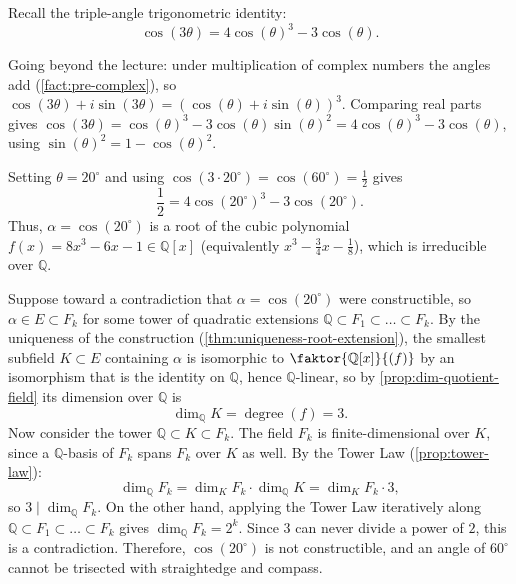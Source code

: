 \begin{content}
Recall the triple-angle trigonometric identity:
\[
\cos(3\theta) = 4 \cos(\theta)^3 - 3 \cos(\theta).
\]

\begin{steps}
Going beyond the lecture: under multiplication of complex numbers the angles add (\cref{fact:pre-complex}), so $\cos(3\theta) + i \sin(3\theta) = (\cos(\theta) + i \sin(\theta))^3$. Comparing real parts gives $\cos(3\theta) = \cos(\theta)^3 - 3 \cos(\theta) \sin(\theta)^2 = 4 \cos(\theta)^3 - 3 \cos(\theta)$, using $\sin(\theta)^2 = 1 - \cos(\theta)^2$.
\end{steps}

Setting $\theta = 20^\circ$ and using $\cos(3 \cdot 20^\circ) = \cos(60^\circ) = \frac{1}{2}$ gives
\[
\frac{1}{2} = 4 \cos(20^\circ)^3 - 3 \cos(20^\circ).
\]
Thus, $\alpha = \cos(20^\circ)$ is a root of the cubic polynomial $f(x) = 8x^3 - 6x - 1 \in \mathbb{Q}[x]$ (equivalently $x^3 - \frac{3}{4}x - \frac{1}{8}$), which is irreducible over $\mathbb{Q}$.

Suppose toward a contradiction that $\alpha = \cos(20^\circ)$ were constructible, so $\alpha \in E \subset F_k$ for some tower of quadratic extensions $\mathbb{Q} \subset F_1 \subset \dots \subset F_k$. By the uniqueness of the construction (\cref{thm:uniqueness-root-extension}), the smallest subfield $K \subset E$ containing $\alpha$ is isomorphic to $\faktor{\mathbb{Q}[x]}{(f)}$ by an isomorphism that is the identity on $\mathbb{Q}$, hence $\mathbb{Q}$-linear, so by \cref{prop:dim-quotient-field} its dimension over $\mathbb{Q}$ is
\[
\dim_{\mathbb{Q}} K = \operatorname{degree}(f) = 3.
\]
Now consider the tower $\mathbb{Q} \subset K \subset F_k$. The field $F_k$ is finite-dimensional over $K$, since a $\mathbb{Q}$-basis of $F_k$ spans $F_k$ over $K$ as well. By the Tower Law (\cref{prop:tower-law}):
\[
\dim_{\mathbb{Q}} F_k = \dim_K F_k \cdot \dim_{\mathbb{Q}} K = \dim_K F_k \cdot 3,
\]
so $3 \mid \dim_{\mathbb{Q}} F_k$. On the other hand, applying the Tower Law iteratively along $\mathbb{Q} \subset F_1 \subset \dots \subset F_k$ gives $\dim_{\mathbb{Q}} F_k = 2^k$. Since $3$ can never divide a power of $2$, this is a contradiction. Therefore, $\cos(20^\circ)$ is not constructible, and an angle of $60^\circ$ cannot be trisected with straightedge and compass.


\end{content}
